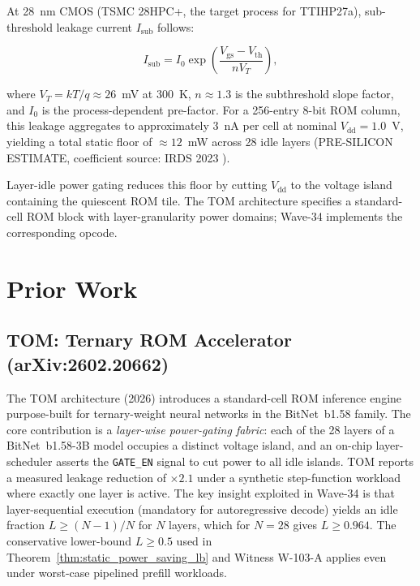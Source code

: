 At 28~nm CMOS (TSMC 28HPC+, the target process for TTIHP27a), sub-threshold
leakage current \(I_{\mathrm{sub}}\) follows:

\begin{equation}
  I_{\mathrm{sub}} = I_{0} \exp\!\left(\frac{V_{\mathrm{gs}} - V_{\mathrm{th}}}
  {n V_{T}}\right),
  \label{eq:subthreshold}
\end{equation}

\noindent where \(V_{T} = kT/q \approx 26\)~mV at 300~K, \(n \approx 1.3\)
is the subthreshold slope factor, and \(I_{0}\) is the process-dependent
pre-factor.  For a 256-entry 8-bit ROM column, this leakage aggregates to
approximately \(3\)~nA per cell at nominal \(V_{\mathrm{dd}} = 1.0\)~V,
yielding a total static floor of \(\approx 12\)~mW across 28 idle layers
(PRE-SILICON ESTIMATE, coefficient source: IRDS 2023 \cite{irds2023}).

Layer-idle power gating reduces this floor by cutting \(V_{\mathrm{dd}}\)
to the voltage island containing the quiescent ROM tile.  The TOM
architecture \cite{tom_arxiv_2602} specifies a standard-cell ROM block with
layer-granularity power domains; Wave-34 implements the corresponding opcode.

\section{Prior Work}
\label{sec:prior_work}

\subsection{TOM: Ternary ROM Accelerator (arXiv:2602.20662)}

The TOM architecture \cite{tom_arxiv_2602} (2026) introduces a standard-cell
ROM inference engine purpose-built for ternary-weight neural networks in the
BitNet~b1.58 family.  The core contribution is a \emph{layer-wise power-gating
fabric}: each of the 28 layers of a BitNet~b1.58-3B model occupies a distinct
voltage island, and an on-chip layer-scheduler asserts the \texttt{GATE\_EN}
signal to cut power to all idle islands.  TOM reports a measured leakage
reduction of \(\times 2.1\) under a synthetic step-function workload where
exactly one layer is active.  The key insight exploited in Wave-34 is that
layer-sequential execution (mandatory for autoregressive decode) yields an
idle fraction \(L \geq (N-1)/N\) for \(N\) layers, which for \(N = 28\)
gives \(L \geq 0.964\).  The conservative lower-bound \(L \geq 0.5\) used in
Theorem~\ref{thm:static_power_saving_lb} and Witness W-103-A applies
even under worst-case pipelined prefill workloads.

